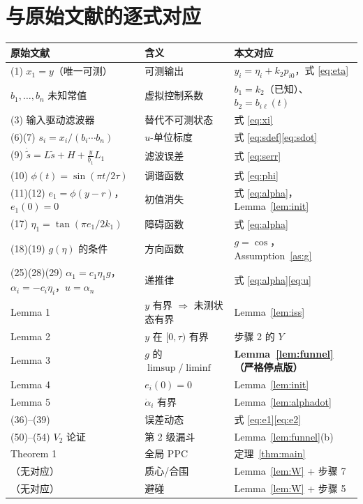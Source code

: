 \documentclass[11pt,a4paper]{article}
\newcommand{\ub}{\underline{b}}
\theoremstyle{plain}
\theoremstyle{definition}
\theoremstyle{remark}
\begin{document}
\section{与原始文献的逐式对应}\label{app:map}
\begin{table}[H]
\centering
\footnotesize
\setlength{\tabcolsep}{4pt}
\begin{tabular}{p{4.5cm}|p{4.0cm}|p{6.0cm}}
\hline
原始文献 & 含义 & 本文对应\\
\hline
(1) $x_1=y$（唯一可测） & 可测输出 & $y_i=\eta_i+k_2p_{i0}$，式 \eqref{eq:eta}\\
$b_1,\dots,b_n$ 未知常值 & 虚拟控制系数 & $b_1=k_2$（已知）、$b_2=b_{i\ell}(t)$\\
(3) 输入驱动滤波器 & 替代不可测状态 & 式 \eqref{eq:xi}\\
(6)(7) $s_i=x_i/(b_i\cdots b_n)$ & $u$-单位标度 & 式 \eqref{eq:sdef}\eqref{eq:sdot}\\
(9) $\dot{\tilde s}=L\tilde s+H+\frac{y}{\ub_1}L_1$ & 滤波误差 & 式 \eqref{eq:serr}\\
(10) $\phi(t)=\sin(\pi t/2\tau)$ & 调谐函数 & 式 \eqref{eq:phi}\\
(11)(12) $e_1=\phi(y-r)$，$e_1(0)=0$ & 初值消失 & 式 \eqref{eq:alpha}，Lemma~\ref{lem:init}\\
(17) $\eta_1=\tan(\pi e_1/2k_1)$ & 障碍函数 & 式 \eqref{eq:alpha}\\
(18)(19) $g(\eta)$ 的条件 & 方向函数 & $g=\cos$，Assumption~\ref{as:g}\\
(25)(28)(29) $\alpha_1=c_1\eta_1g$，$\alpha_i=-c_i\eta_i$，$u=\alpha_n$ & 递推律
& 式 \eqref{eq:alpha}\eqref{eq:u}\\
Lemma 1 & $y$ 有界 $\Rightarrow$ 未测状态有界 & Lemma~\ref{lem:iss}\\
Lemma 2 & $y$ 在 $[0,\tau)$ 有界 & 步骤 2 的 $Y$\\
Lemma 3 & $g$ 的 $\limsup/\liminf$ & \textbf{Lemma~\ref{lem:funnel}（严格停点版）}\\
Lemma 4 & $e_i(0)=0$ & Lemma~\ref{lem:init}\\
Lemma 5 & $\dot\alpha_i$ 有界 & Lemma~\ref{lem:alphadot}\\
(36)--(39) & 误差动态 & 式 \eqref{eq:e1}\eqref{eq:e2}\\
(50)--(54) $V_2$ 论证 & 第 2 级漏斗 & Lemma~\ref{lem:funnel}(b)\\
Theorem 1 & 全局 PPC & 定理~\ref{thm:main}\\
（无对应） & 质心/合围 & Lemma~\ref{lem:W} + 步骤 7\\
（无对应） & 避碰 & Lemma~\ref{lem:W} + 步骤 5\\
\hline
\end{tabular}
\end{table}
\end{document}
